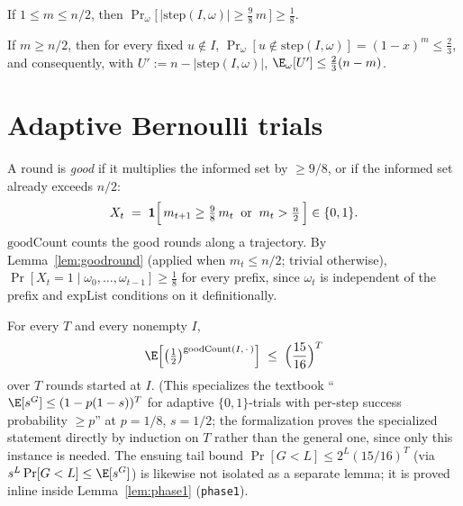 \begin{lemma}\label{lem:goodround}
  \leanok
  If $1 \le m \le n/2$, then
  $\Pr_\omega\bigl[\,|\mathrm{step}(I,\omega)| \ge \tfrac{9}{8}\,m\,\bigr]
    \ge \tfrac18$.
\end{lemma}

\begin{lemma}\label{lem:contract}
  \leanok
  If $m \ge n/2$, then for every fixed $u \notin I$,
  $\Pr_\omega[u \notin \mathrm{step}(I,\omega)] = (1-x)^m \le \tfrac23$, and
  consequently, with $U' := n - |\mathrm{step}(I,\omega)|$,
  $\E_\omega[U'] \le \tfrac23(n-m)$.
\end{lemma}

\section{Adaptive Bernoulli trials}\label{sec:adaptive}

\begin{definition}\label{def:good}
  \leanok
  A round is \emph{good} if it multiplies the informed set by $\ge 9/8$, or
  if the informed set already exceeds $n/2$:
  \[
    X_t \;=\; \mathbf{1}\Bigl[\, m_{t+1} \ge \tfrac98\, m_t
    \;\;\text{or}\;\; m_t > \tfrac n2 \,\Bigr] \in \{0,1\}.
  \]
  $\mathrm{goodCount}$ counts the good rounds along a trajectory. By
  Lemma~\ref{lem:goodround} (applied when $m_t \le n/2$; trivial otherwise),
  $\Pr[X_t = 1 \mid \omega_0,\dots,\omega_{t-1}] \ge \tfrac18$ for every
  prefix, since $\omega_t$ is independent of the prefix and
  $\mathrm{expList}$ conditions on it definitionally.
\end{definition}

\begin{lemma}\label{lem:adaptive}
  \leanok
  For every $T$ and every nonempty $I$,
  \[
    \E\Bigl[\bigl(\tfrac12\bigr)^{\mathrm{goodCount}(I,\,\cdot\,)}\Bigr]
      \;\le\; \Bigl(\frac{15}{16}\Bigr)^{T}
  \]
  over $T$ rounds started at $I$. (This specializes the textbook
  ``$\E[s^G] \le (1-p(1-s))^T$ for adaptive $\{0,1\}$-trials with
  per-step success probability $\ge p$'' at $p = 1/8$, $s = 1/2$; the
  formalization proves the specialized statement directly by induction on
  $T$ rather than the general one, since only this instance is needed. The
  ensuing tail bound $\Pr[G < L] \le 2^{L}(15/16)^{T}$ (via
  $s^{L}\Pr[G<L] \le \E[s^G]$) is likewise not isolated as a separate
  lemma; it is proved inline inside Lemma~\ref{lem:phase1}
  (\texttt{phase1}).
\end{lemma}


